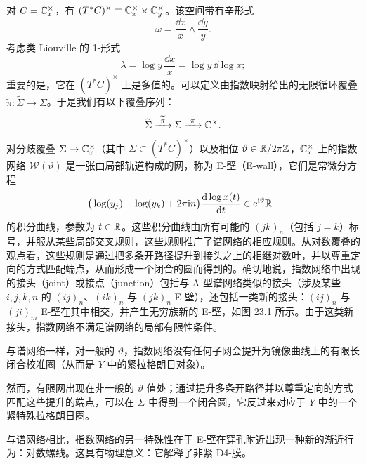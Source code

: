 对 $C=\mathbb{C}^\times_x$，有 $(T^*C)^\times\equiv\mathbb{C}^\times_x\times\mathbb{C}^\times_y$。该空间带有辛形式
\[
\omega=\frac{\dd x}{x}\wedge\frac{\dd y}{y}.
\]
考虑类 Liouville 的 1-形式
\[
\lambda=\log y\,\frac{\dd x}{x}=\log y\,\dd\log x;
\]
重要的是，它在 $(T^*C)^\times$ 上是多值的。可以定义由指数映射给出的无限循环覆叠 $\widetilde{\pi}:\widetilde{\Sigma}\to\Sigma$。于是我们有以下覆叠序列：
\[
\widetilde{\Sigma}\xrightarrow{\ \widetilde{\pi}\ }\Sigma\xrightarrow{\ \pi\ }\C^\times .
\]
对分歧覆叠 $\Sigma\to\mathbb{C}^\times_x$（其中 $\Sigma\subset(T^*C)^\times$）以及相位 $\vartheta\in\mathbb{R}/2\pi\mathbb{Z}$，$\mathbb{C}^\times_x$ 上的指数网络 $\mathcal{W}(\vartheta)$ 是一张由局部轨道构成的网，称为 E-壁（E-wall），它们是常微分方程
\[
\big(\log(y_j)-\log(y_k)+2\pi\mathrm{i} n\big)\frac{\mathrm{d}\log x(t)}{\mathrm{d} t}\in \mathrm{e}^{\mathrm{i}\vartheta}\mathbb{R}_+
\]
的积分曲线，参数为 $t\in\mathbb{R}$。这些积分曲线由所有可能的 $(jk)_n$（包括 $j=k$）标号，并服从某些局部交叉规则，这些规则推广了谱网络的相应规则。从对数覆叠的观点看，这些规则是通过把多条开路径提升到接头之上的相继对数叶，并以尊重定向的方式匹配端点，从而形成一个闭合的圆而得到的。确切地说，指数网络中出现的接头（joint）或接点（junction）包括与 A 型谱网络类似的接头（涉及某些 $i,j,k,n$ 的 $(ij)_n$、$(ik)_n$ 与 $(jk)_n$ E-壁），还包括一类新的接头：$(ij)_n$ 与 $(ji)_m$ E-壁在其中相交，并产生无穷族新的 E-壁，如图 23.1 所示。由于这类新接头，指数网络不满足谱网络的局部有限性条件。


与谱网络一样，对一般的 $\vartheta$，指数网络没有任何子网会提升为镜像曲线上的有限长闭合校准圈（从而是 $Y$ 中的紧拉格朗日对象）。

然而，有限网出现在非一般的 $\vartheta$ 值处；通过提升多条开路径并以尊重定向的方式匹配这些提升的端点，可以在 $\Sigma$ 中得到一个闭合圆，它反过来对应于 $Y$ 中的一个紧特殊拉格朗日圈。

与谱网络相比，指数网络的另一特殊性在于 E-壁在穿孔附近出现一种新的渐近行为：对数螺线。这具有物理意义：它解释了非紧 D4-膜。

